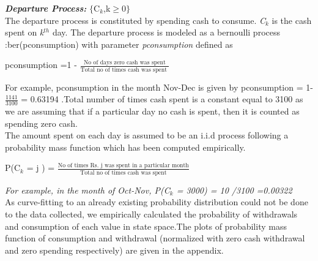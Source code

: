 \documentclass[12pt]{article}
\newcommand*\textfrac[2]{
  \frac{\text{#1}}{\text{#2}}
}
\begin{document}
\textit{\textbf{Departure Process:}} $\lbrace$C$_{k}$,k$\geq$0$\rbrace$ \\
     The departure process is constituted by spending cash to consume. \textit{C$_{k}$} is the cash spent on \textit{k$^{th}$} day. The departure process is modeled as a bernoulli process :ber(pconsumption) with parameter \textit{pconsumption} defined as
    \begin{center}
    pconsumption =1 -  $\textfrac{No of days zero cash was spent}{Total no of times cash was spent }$
    \end{center}
    For example, pconsumption in the month Nov-Dec is given by pconsumption = 1- $\frac{1141}{3100}$ = 0.63194 .Total number of times cash spent is a constant equal to 3100 as we are assuming that if a particular day no cash is spent, then it is counted as spending zero cash.\\
    The amount spent on each day is assumed to be an i.i.d process following a probability mass function which has been computed empirically.  
    \begin{center}
    P(C$_{k}$ = j ) = $\textfrac{No of times Rs. j was spent in a particular month}{Total no of times cash was spent}$
    \end{center}
    \textit{For example, in the month of Oct-Nov, P(C$_{k}$ = 3000) = 10 /3100 =0.00322}\\
    

As curve-fitting to an already existing probability distribution could not be done to the data collected, we empirically calculated the probability of withdrawals and consumption of each value in state space.The plots of probability mass function of consumption and withdrawal (normalized with zero cash withdrawal and zero spending respectively) are given in the appendix.\\ 
\end{document}
